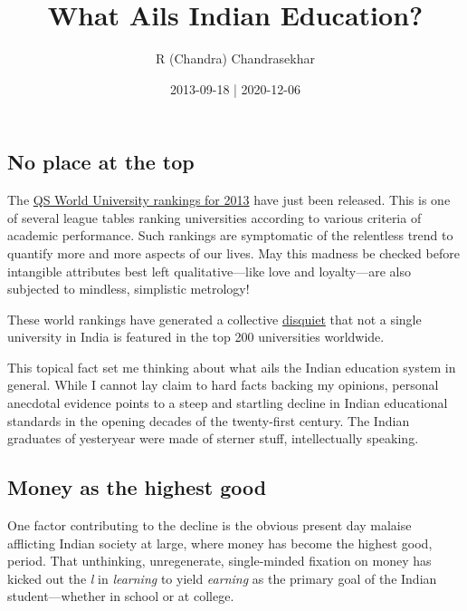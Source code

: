 \documentclass[
  11pt,
  british,
  a4paper,
]{article}
\title{What Ails Indian Education?}
\author{R (Chandra) Chandrasekhar}
\date{2013-09-18 | 2020-12-06}
\begin{document}
\maketitle

\thispagestyle{empty}


\hypertarget{no-place-at-the-top}{%
\subsection{No place at the top}\label{no-place-at-the-top}}

The
\href{http://www.topuniversities.com/university-rankings/world-university-rankings/2013\#sorting=rank+region=+country=+faculty=+stars=false+search=}{QS
World University rankings for 2013} have just been released. This is one
of several league tables ranking universities according to various
criteria of academic performance. Such rankings are symptomatic of the
relentless trend to quantify more and more aspects of our lives. May
this madness be checked before intangible attributes best left
qualitative---like love and loyalty---are also subjected to mindless,
simplistic metrology!

These world rankings have generated a collective
\href{http://articles.timesofindia.indiatimes.com/2013-09-11/news/41969629_1_qs-world-university-rankings-mumbai-university-indian}{disquiet}
that not a single university in India is featured in the top 200
universities worldwide.

This topical fact set me thinking about what ails the Indian education
system in general. While I cannot lay claim to hard facts backing my
opinions, personal anecdotal evidence points to a steep and startling
decline in Indian educational standards in the opening decades of the
twenty-first century. The Indian graduates of yesteryear were made of
sterner stuff, intellectually speaking.

\hypertarget{money-as-the-highest-good}{%
\subsection{Money as the highest good}\label{money-as-the-highest-good}}

One factor contributing to the decline is the obvious present day
malaise afflicting Indian society at large, where money has become the
highest good, period. That unthinking, unregenerate, single-minded
fixation on money has kicked out the \emph{l} in \emph{learning} to
yield \emph{earning} as the primary goal of the Indian student---whether
in school or at college.
\end{document}
